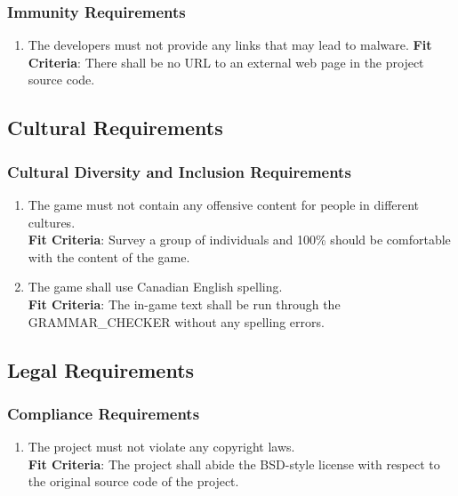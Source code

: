 \documentclass[12pt, titlepage]{article}
\begin{document}
\subsubsection{Immunity Requirements}
\begin{enumerate}[leftmargin=1.45cm, start=1,label={SR \arabic*}]
    \item The developers must not provide any links that may lead to malware.
    \textbf{Fit Criteria}: There shall be no URL to an external web page in the project source code.
\end{enumerate}

\subsection{Cultural Requirements}
\subsubsection{Cultural Diversity and Inclusion Requirements}
\begin{enumerate}[leftmargin=1.20cm, label={CR \arabic*}]
    \item The game must not contain any offensive content for people in different cultures.\\
    \textbf{Fit Criteria}: Survey a group of individuals and 100\% should be comfortable with the content of the game.
    
    \item The game shall use Canadian English spelling. \\
    \textbf{Fit Criteria}: The in-game text shall be run through the GRAMMAR\_CHECKER without any spelling errors. 
\end{enumerate}
\subsection{Legal Requirements}
\subsubsection{Compliance Requirements}
\begin{enumerate}[leftmargin=1.20cm, label={CR \arabic*}]
    \item The project must not violate any copyright laws. \\
    \textbf{Fit Criteria}: The project shall abide the BSD-style license with respect to the original source code of the project. 
\end{enumerate}
\end{document}
